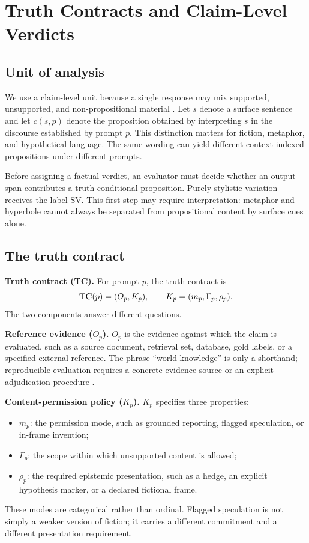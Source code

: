 \documentclass{clv2025}
\newcommand{\TC}{\textsc{TC}}
\newcommand{\SV}{\textsc{SV}}
\begin{document}
\section{Truth Contracts and Claim-Level Verdicts}\label{sec:framework}

\subsection{Unit of analysis}

We use a claim-level unit because a single response may mix supported, unsupported, and non-propositional material \citep{min_factscore_2023,bayat_factbench_2024}.
Let $s$ denote a surface sentence and let $c(s,p)$ denote the proposition obtained by interpreting $s$ in the discourse established by prompt $p$.
This distinction matters for fiction, metaphor, and hypothetical language.
The same wording can yield different context-indexed propositions under different prompts.

Before assigning a factual verdict, an evaluator must decide whether an output span contributes a truth-conditional proposition.
Purely stylistic variation receives the label \SV.
This first step may require interpretation: metaphor and hyperbole cannot always be separated from propositional content by surface cues alone.

\subsection{The truth contract}

\textbf{Truth contract (\TC).}
For prompt $p$, the truth contract is
\[
  \TC(p)=(O_p,K_p), \qquad K_p=(m_p,\Gamma_p,\rho_p).
\]
The two components answer different questions.

\textbf{Reference evidence ($O_p$).}
$O_p$ is the evidence against which the claim is evaluated, such as a source document, retrieval set, database, gold labels, or a specified external reference.
The phrase ``world knowledge'' is only a shorthand; reproducible evaluation requires a concrete evidence source or an explicit adjudication procedure \citep{ji_survey_2023,bang_hallulens_2025}.

\textbf{Content-permission policy ($K_p$).}
$K_p$ specifies three properties:
\begin{itemize}
  \item $m_p$: the permission mode, such as grounded reporting, flagged speculation, or in-frame invention;
  \item $\Gamma_p$: the scope within which unsupported content is allowed;
  \item $\rho_p$: the required epistemic presentation, such as a hedge, an explicit hypothesis marker, or a declared fictional frame.
\end{itemize}
These modes are categorical rather than ordinal.
Flagged speculation is not simply a weaker version of fiction; it carries a different commitment and a different presentation requirement.
\end{document}
